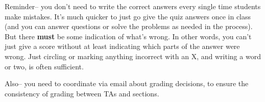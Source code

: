 \documentclass[11pt,fleqn]{article}
\begin{document}

  Reminder-- you don't need to write the correct answers every single time
students make mistakes.  It's much quicker to just go give the quiz answers
once in class (and you can answer questions or solve the problems as needed
in the process).  But there \textbf{must} be some indication of what's
wrong.  In other words, you can't just give a score without at least
indicating which parts of the answer were wrong.  Just circling or marking
anything incorrect with an X, and writing a word or two, is often
sufficient.

  Also-- you need to coordinate via email about grading decisions, to ensure
the consistency of grading between TAs and sections.

  \vspace{-0mm}
\end{document}
